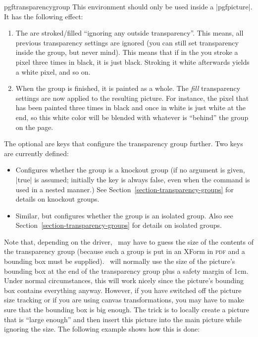 \begin{environment}{{pgftransparencygroup}}
    This environment should only be used inside a |{pgfpicture}|. It has the
    following effect:
    \begin{enumerate}
        \item The  are stroked/filled ``ignoring any
            outside transparency''. This means, all previous transparency
            settings are ignored (you can still set transparency inside the
            group, but never mind). This means that if in the  you stroke a pixel three times in black, it is just
            black. Stroking it white afterwards yields a white pixel, and so
            on.
        \item When the group is finished, it is painted as a whole. The
            \emph{fill} transparency settings are now applied to the resulting
            picture. For instance, the pixel that has been painted three times
            in black and once in white is just white at the end, so this white
            color will be blended with whatever is ``behind'' the group on the
            page.
    \end{enumerate}

    The optional  are keys that configure the transparency group
    further. Two keys are currently defined:
    \begin{itemize}
        \item {} Configures
            whether the group is a knockout group (if no argument is given,
            |true| is assumed; initially the key is always false, even when the
            command is used in a nested manner.) See
            Section~\ref{section-transparency-groups} for details on knockout
            groups.
        \item {} Similar, but
            configures whether the group is an isolated group. Also see
            Section~\ref{section-transparency-groups} for details on isolated
            groups.
    \end{itemize}

    Note that, depending on the driver, \pgfname\ may have to guess the size of
    the contents of the transparency group (because such a group is put in an
    XForm in \textsc{pdf} and a bounding box must be supplied). \pgfname\ will
    normally use the size of the picture's bounding box at the end of the
    transparency group plus a safety margin of 1cm. Under normal circumstances,
    this will work nicely since the picture's bounding box contains everything
    anyway. However, if you have switched off the picture size tracking or if
    you are using canvas transformations, you may have to make sure that the
    bounding box is big enough. The trick is to locally create a picture that
    is ``large enough'' and then insert this picture into the main picture
    while ignoring the size. The following example shows how this is done:


\end{environment}
